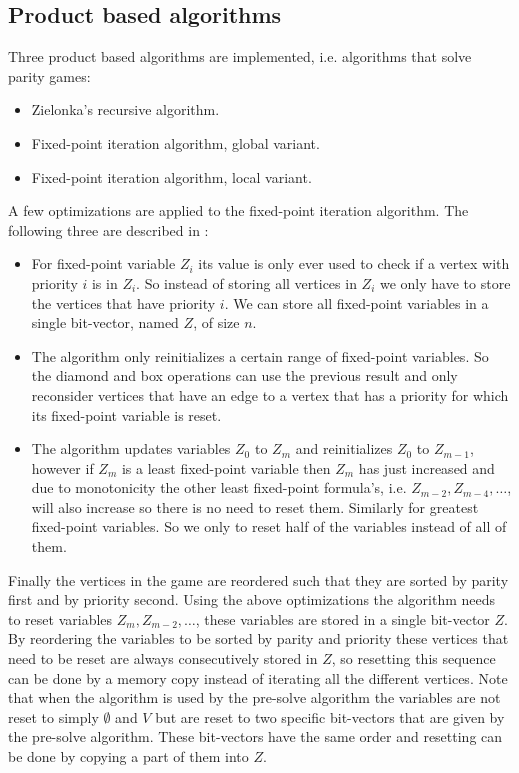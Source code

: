 \subsection{Product based algorithms}
Three product based algorithms are implemented, i.e. algorithms that solve parity games:
\begin{itemize}
	\item Zielonka's recursive algorithm.
	\item Fixed-point iteration algorithm, global variant.
	\item Fixed-point iteration algorithm, local variant.
\end{itemize}
A few optimizations are applied to the fixed-point iteration algorithm. The following three are described in \cite{FPITE}:
\begin{itemize}
	\item For fixed-point variable $Z_i$ its value is only ever used to check if a vertex with priority $i$ is in $Z_i$. So instead of storing all vertices in $Z_i$ we only have to store the vertices that have priority $i$. We can store all fixed-point variables in a single bit-vector, named $Z$, of size $n$.
	\item The algorithm only reinitializes a certain range of fixed-point variables. So the diamond and box operations can use the previous result and only reconsider vertices that have an edge to a vertex that has a priority for which its fixed-point variable is reset.
	\item The algorithm updates variables $Z_0$ to $Z_m$ and reinitializes $Z_0$ to $Z_{m-1}$, however if $Z_m$ is a least fixed-point variable then $Z_m$ has just increased and due to monotonicity the other least fixed-point formula's, i.e. $Z_{m-2},Z_{m-4},\dots$, will also increase so there is no need to reset them. Similarly for greatest fixed-point variables. So we only to reset half of the variables instead of all of them.
\end{itemize}
Finally the vertices in the game are reordered such that they are sorted by parity first and by priority second. Using the above optimizations the algorithm needs to reset variables $Z_{m}, Z_{m-2},\dots$, these variables are stored in a single bit-vector $Z$. By reordering the variables to be sorted by parity and priority these vertices that need to be reset are always consecutively stored in $Z$, so resetting this sequence can be done by a memory copy instead of iterating all the different vertices. Note that when the algorithm is used by the pre-solve algorithm the variables are not reset to simply $\emptyset$ and $V$ but are reset to two specific bit-vectors that are given by the pre-solve algorithm. These bit-vectors have the same order and resetting can be done by copying a part of them into $Z$.

